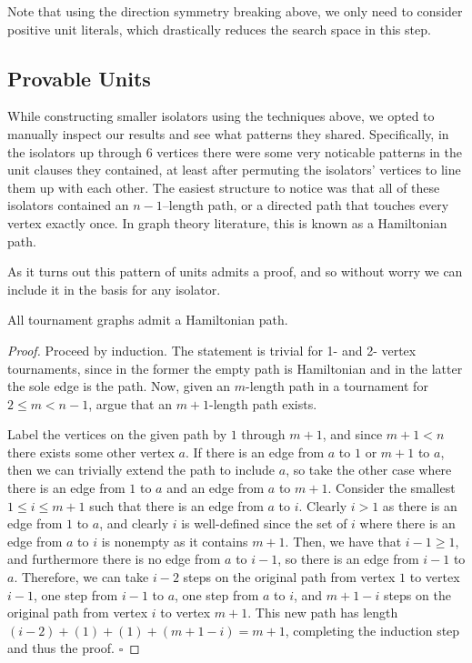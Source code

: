 \documentclass[a4paper,UKenglish,cleveref, autoref, thm-restate]{lipics-v2021}
\begin{document}
Note that using the direction symmetry breaking above, we only need to consider positive unit literals, which drastically reduces the search space in this step.

\subsection{Provable Units}

While constructing smaller isolators using the techniques above, we opted to manually inspect our results and see what patterns they shared.  Specifically, in the isolators up through 6 vertices there were some very noticable patterns in the unit clauses they contained, at least after permuting the isolators' vertices to line them up with each other.  The easiest structure to notice was that all of these isolators contained an $n-1$--length path, or a directed path that touches every vertex exactly once.  In graph theory literature, this is known as a Hamiltonian path.

As it turns out this pattern of units admits a proof, and so without worry we can include it in the basis for any isolator.

\begin{theorem}
All tournament graphs admit a Hamiltonian path.
\end{theorem}

\begin{proof}
Proceed by induction.  The statement is trivial for 1- and 2- vertex tournaments, since in the former the empty path is Hamiltonian and in the latter the sole edge is the path.  Now, given an $m$-length path in a tournament for $2 \le m < n-1$, argue that an $m+1$-length path exists.

Label the vertices on the given path by $1$ through $m+1$, and since $m+1 < n$ there exists some other vertex $a$.  If there is an edge from $a$ to $1$ or $m+1$ to $a$, then we can trivially extend the path to include $a$, so take the other case where there is an edge from $1$ to $a$ and an edge from $a$ to $m+1$.  Consider the smallest $1 \le i \le m+1$ such that there is an edge from $a$ to $i$.  Clearly $i > 1$ as there is an edge from $1$ to $a$, and clearly $i$ is well-defined since the set of $i$ where there is an edge from $a$ to $i$ is nonempty as it contains $m+1$.  Then, we have that $i-1 \ge 1$, and furthermore there is no edge from $a$ to $i-1$, so there is an edge from $i-1$ to $a$.  Therefore, we can take $i-2$ steps on the original path from vertex $1$ to vertex $i-1$, one step from $i-1$ to $a$, one step from $a$ to $i$, and $m+1-i$ steps on the original path from vertex $i$ to vertex $m+1$.  This new path has length $(i-2) + (1) + (1) + (m+1-i) = m+1$, completing the induction step and thus the proof.  $\square$
\end{proof}
\end{document}
